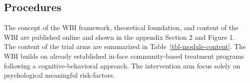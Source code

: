 \documentclass[
  super,
  preprint,
  1p,
  onecolumn]{elsarticle}
\begin{document}
\subsection{Procedures}\label{procedures}

The concept of the WBI framework, theoretical foundation, and content of
the WBI are published online
\citep{frombergerMyTabuAPlaceboControlled2021} and shown in the appendix
Section 2 and Figure 1. The content of the trial arms are summarized in
Table~\ref{tbl-module-content}. The WBI builds on already established
in-face community-based treatment programs following a
cognitive-behavioral approach.
\citep{brikenPraeventionSexuellenKindesmissbrauchs2017, wildPreventionSexualChild2020}
The intervention arm focus solely on psychological meaningful
risk-factors. \citep{setoEmpiricallybasedDynamicRisk2023}

\newpage{}
\end{document}
